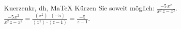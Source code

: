 \begin{MAufgabe}{Kuerzen}{kr, dh, MaTeX}
K\"urzen Sie soweit m\"oglich: $\frac{- 5\, x^2}{x^2\, z - x^2}$.\\ 
\ifLsg\MLoesung
\quad $\frac{- 5\, x^2}{x^2\, z - x^2}=\frac{(x^2)\cdot(-5)}{(x^2)\cdot(z - 1)}=\frac{-5}{z - 1}$.\else\relax\fi
 \end{MAufgabe}